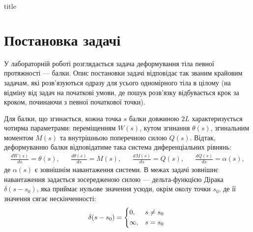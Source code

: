 \documentclass{mathreport}
\begin{document}




{title}

\tableofcontents

\newpage

\section{Постановка задачі}

У лабораторній роботі розглядається задача деформування тіла певної протяжності --- балки. Опис постановки задачі відповідає так званим крайовим задачам, які розв'язуються одразу для усього одномірного тіла в цілому (на відміну від задач на початкові умови, де пошук розв'язку відбувається крок за кроком, починаючи з певної початкової точки).

Для балки, що згинається, кожна точка $s$ балки довжиною $2L$ характеризується чотирма параметрами: переміщенням $W(s)$, кутом згинання $\theta(s)$, згинальним моментом $M(s)$ та внутрішньою поперечною силою $Q(s)$. Відтак, деформуванню балки відповідатиме така система диференціальних рівнянь:
\begin{align}\label{eq: initial d.e.}
    \frac{dW(s)}{ds} = \theta(s), &&  \frac{d\theta(s)}{ds} = M(s), && \frac{dM(s)}{ds} = Q(s), && \frac{dQ(s)}{ds} = \alpha(s),
\end{align}
де $\alpha(s)$ є зовнішнім навантаження системи. В межах задачі зовнішнє навантаження задається зосередженою силою --- дельта-функцією Дірака $\delta(s-s_0)$, яка приймає нульове значення усюди, окрім околу точки $s_0$, де її значення сягає нескінченності:
\begin{align}\label{eq: delta Dirac}
    \delta(s-s_0)=
    \begin{cases*}
        0, & $s \neq s_0$ \\
        \infty, & $s=s_0$ \\
    \end{cases*}
\end{align}
\end{document}
